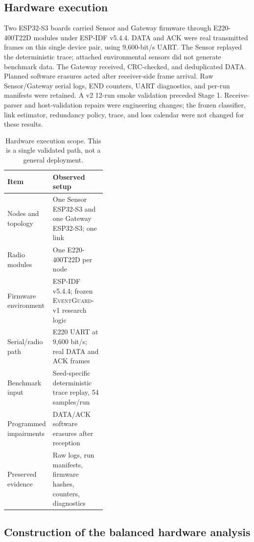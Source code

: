 \documentclass[11pt]{article}
\newcommand{\EG}{\textsc{EventGuard}}
\begin{document}
\subsection{Hardware execution}\label{sec:hardware-execution}

Two ESP32-S3 boards carried Sensor and Gateway firmware through E220-400T22D modules under ESP-IDF v5.4.4. DATA and ACK were real transmitted frames on this single device pair, using 9,600-bit/s UART. The Sensor replayed the deterministic trace; attached environmental sensors did not generate benchmark data. The Gateway received, CRC-checked, and deduplicated DATA. Planned software erasures acted after receiver-side frame arrival. Raw Sensor/Gateway serial logs, END counters, UART diagnostics, and per-run manifests were retained. A v2 12-run smoke validation preceded Stage 1. Receive-parser and host-validation repairs were engineering changes; the frozen classifier, link estimator, redundancy policy, trace, and loss calendar were not changed for these results.

\begin{table}[t]
\centering
\small
\caption{Hardware execution scope. This is a single validated path, not a general deployment.}
\label{tab:hardware-setup}
\begin{tabularx}{\linewidth}{@{}>{\raggedright\arraybackslash}p{0.40\linewidth}>{\raggedright\arraybackslash}X@{}}
\toprule
Item & Observed setup \\
\midrule
Nodes and topology & One Sensor ESP32-S3 and one Gateway ESP32-S3; one link \\
Radio modules & One E220-400T22D per node \\
Firmware environment & ESP-IDF v5.4.4; frozen \EG{}-v1 research logic \\
Serial/radio path & E220 UART at 9,600 bit/s; real DATA and ACK frames \\
Benchmark input & Seed-specific deterministic trace replay, 54 samples/run \\
Programmed impairments & DATA/ACK software erasures after reception \\
Preserved evidence & Raw logs, run manifests, firmware hashes, counters, diagnostics \\
\bottomrule
\end{tabularx}
\end{table}

\subsection{Construction of the balanced hardware analysis}\label{sec:construction-of-the-balanced-hardware-analysis}
\end{document}
